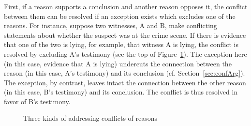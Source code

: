 \documentclass[10pt]{article}
\begin{document}
First, if a reason supports a conclusion and another reason opposes it, the conflict between them can be resolved if an exception exists which 
excludes one of the reasons. For instance, suppose two witnesses, A and B, make conflicting statements about 
whether the suspect was at the crime scene. If there is evidence that one of the two is lying, for example, that witness A is lying, 
the conflict is resolved by excluding A's testimony (see the top of Figure~\ref{fig:conflicts}). The exception here (in this case, evidence that A is lying) 
undercuts the connection between the reason (in this case, A's testimony) and its conclusion (cf. Section~\ref{sec:confArg}). The exception, by contrast, 
leaves intact the connection between the other reason (in this case, B's testimony) and its conclusion. The conflict 
is thus resolved in favor of B's testimony. 





\begin{figure}[bt]
\centering

\caption{Three kinds of addressing conflicts of reasons\label{fig:conflicts}}
\end{figure}
\end{document}
